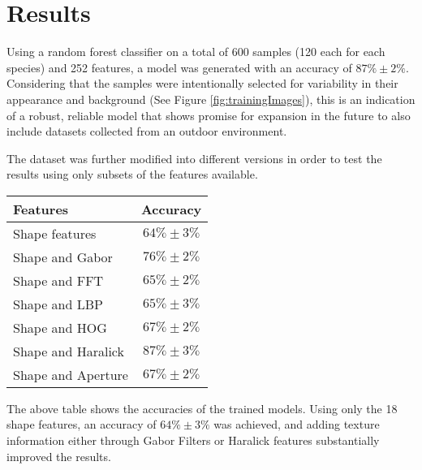\section{Results}

Using a random forest classifier on a total of 600 samples (120 each for each species) and 252 features, a model was generated with an accuracy of $87\% \pm 2\%$. Considering that the samples were intentionally selected for variability in their appearance and background (See Figure \ref{fig:trainingImages}), this is an indication of a robust, reliable model that shows promise for expansion in the future to also include datasets collected from an outdoor environment. 

The dataset was further modified into different versions in order to test the results using only subsets of the features available.

\begin{table}
    \centering
        \begin{tabular}{ l c }
            \toprule
            Features & Accuracy \\ \midrule
            Shape features & $64\% \pm 3\%$ \\ 
            Shape and Gabor & $76\% \pm 2\%$ \\ 
            Shape and FFT & $65\% \pm 2\%$ \\ 
            Shape and LBP & $65\% \pm 3\%$ \\ 
            Shape and HOG & $67\% \pm 2\%$ \\ 
            Shape and Haralick & $87\% \pm 3\%$ \\ 
            Shape and Aperture & $67\% \pm 2\%$ \\
            \bottomrule
        \end{tabular}
\end{table}

The above table shows the accuracies of the trained models. Using only the 18 shape features, an accuracy of $64\% \pm 3\%$ was achieved, and adding texture information either through Gabor Filters or Haralick features substantially improved the results.

  
  
  
  
  
  
  
  
  
  
  
  
  
  
  
  
  
  
  
  
  
  